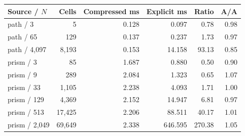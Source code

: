 \begin{tabular}{lrrrrr}
\toprule
Source / $N$ & Cells & Compressed ms & Explicit ms & Ratio & A/A\\
\midrule
path / 3 & 5 & 0.128 & 0.097 & 0.78 & 0.98 \\
path / 65 & 129 & 0.137 & 0.237 & 1.73 & 0.97 \\
path / 4,097 & 8,193 & 0.153 & 14.158 & 93.13 & 0.85 \\
prism / 3 & 85 & 1.687 & 0.880 & 0.50 & 0.90 \\
prism / 9 & 289 & 2.084 & 1.323 & 0.65 & 1.07 \\
prism / 33 & 1,105 & 2.238 & 4.093 & 1.71 & 1.00 \\
prism / 129 & 4,369 & 2.152 & 14.947 & 6.81 & 0.97 \\
prism / 513 & 17,425 & 2.206 & 88.511 & 40.17 & 1.01 \\
prism / 2,049 & 69,649 & 2.338 & 646.595 & 270.38 & 1.05 \\
\bottomrule
\end{tabular}
